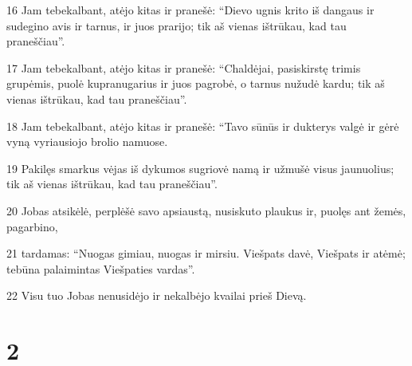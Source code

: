 \par 16 Jam tebekalbant, atėjo kitas ir pranešė: “Dievo ugnis krito iš dangaus ir sudegino avis ir tarnus, ir juos prarijo; tik aš vienas ištrūkau, kad tau praneščiau”. 
\par 17 Jam tebekalbant, atėjo kitas ir pranešė: “Chaldėjai, pasiskirstę trimis grupėmis, puolė kupranugarius ir juos pagrobė, o tarnus nužudė kardu; tik aš vienas ištrūkau, kad tau praneščiau”. 
\par 18 Jam tebekalbant, atėjo kitas ir pranešė: “Tavo sūnūs ir dukterys valgė ir gėrė vyną vyriausiojo brolio namuose. 
\par 19 Pakilęs smarkus vėjas iš dykumos sugriovė namą ir užmušė visus jaunuolius; tik aš vienas ištrūkau, kad tau praneščiau”. 
\par 20 Jobas atsikėlė, perplėšė savo apsiaustą, nusiskuto plaukus ir, puolęs ant žemės, pagarbino, 
\par 21 tardamas: “Nuogas gimiau, nuogas ir mirsiu. Viešpats davė, Viešpats ir atėmė; tebūna palaimintas Viešpaties vardas”. 
\par 22 Visu tuo Jobas nenusidėjo ir nekalbėjo kvailai prieš Dievą.


\chapter{2}


